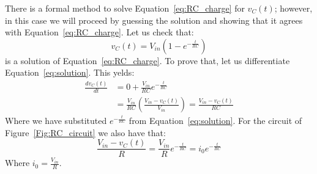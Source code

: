 There is a formal method to solve Equation~\ref{eq:RC_charge} for $v_C(t)$; however, in this case we will proceed by guessing the solution and showing that it agrees with Equation~\ref{eq:RC_charge}.
Let us check that:
\begin{equation}
\label{eq:solution}
v_C(t) = V_{in}\left(1-e^{-\frac{t}{RC}}\right)
\end{equation}
is a solution of Equation~\ref{eq:RC_charge}. To prove that, let us differentiate Equation~\ref{eq:solution}. This yelds:
\begin{equation}
\label{eq:proof}
\begin{split}
\frac{dv_C(t)}{dt} &= 0 + \frac{V_{in}}{RC}e^{-\frac{t}{RC}}\\
 &=\frac{V_{in}}{RC}\left(\frac{V_{in}-v_C(t)}{V_{in}}\right) = \frac{V_{in}-v_C(t)}{RC} 
\end{split}
\end{equation}
Where we have substituted $e^{-\frac{t}{RC}}$ from Equation~\ref{eq:solution}. For the circuit of Figure~\ref{Fig:RC_circuit} we also have that:
\begin{equation}
\frac{V_{in}-v_C(t)}{R}=\frac{V_{in}}{R}e^{-\frac{t}{RC}} = i_0e^{-\frac{t}{RC}}
\end{equation}
Where $i_0=\frac{V_{in}}{R}$.

